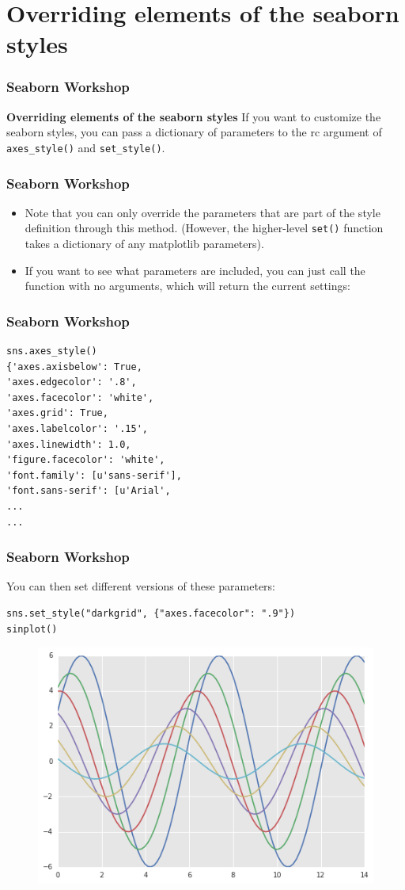 \documentclass{beamer}
\begin{document}
\section{Overriding elements of the seaborn styles}
\begin{frame}[fragile]
	\frametitle{Seaborn Workshop}
	\large
\noindent \textbf{Overriding elements of the seaborn styles}
If you want to customize the seaborn styles, you can pass a dictionary of parameters to the rc argument of \texttt{axes\_style()} and \texttt{set\_style()}. 
\end{frame}
\begin{frame}[fragile]
	\frametitle{Seaborn Workshop}
	\large
\begin{itemize}
\item Note that you can only override the parameters that are part of the style definition through this method. (However, the higher-level \texttt{set()} function takes a dictionary of any matplotlib parameters).
\item 
If you want to see what parameters are included, you can just call the function with no arguments, which will return the current settings:
\end{itemize}
\end{frame}
\begin{frame}[fragile]
	\frametitle{Seaborn Workshop}
	\large
\begin{verbatim}
sns.axes_style()
{'axes.axisbelow': True,
'axes.edgecolor': '.8',
'axes.facecolor': 'white',
'axes.grid': True,
'axes.labelcolor': '.15',
'axes.linewidth': 1.0,
'figure.facecolor': 'white',
'font.family': [u'sans-serif'],
'font.sans-serif': [u'Arial',
...
...
\end{verbatim}

\end{frame}
\begin{frame}[fragile]
	\frametitle{Seaborn Workshop}
	\large
You can then set different versions of these parameters:
\begin{verbatim}
sns.set_style("darkgrid", {"axes.facecolor": ".9"})
sinplot()
\end{verbatim}

\begin{figure}
\centering
\includegraphics[width=0.7\linewidth]{images/aesthetics_31_0}
\end{figure}

\end{frame}
\end{document}

